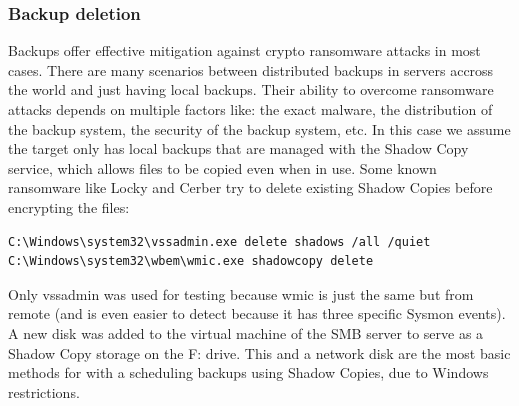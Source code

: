 {%

\subsubsection{Backup deletion}
Backups offer effective mitigation against crypto ransomware attacks in most cases.
There are many scenarios between distributed backups in servers accross the world and just having local backups.
Their ability to overcome ransomware attacks depends on multiple factors like: the exact malware, the distribution of the backup system, the security of the backup system, etc.
\linej
In this case we assume the target only has local backups that are managed with the Shadow Copy service, which allows files to be copied even when in use.
Some known ransomware like Locky and Cerber try to delete existing Shadow Copies before encrypting the files\cite{ransomware_oReilly}:
\begin{lstlisting}[style=PS]
C:\Windows\system32\vssadmin.exe delete shadows /all /quiet
C:\Windows\system32\wbem\wmic.exe shadowcopy delete
\end{lstlisting}
\linej
Only vssadmin was used for testing because wmic is just the same but from remote (and is even easier to detect because it has three specific Sysmon events).
A new disk was added to the virtual machine of the SMB server to serve as a Shadow Copy storage on the F: drive.
This and a network disk are the most basic methods for with a scheduling backups using Shadow Copies, due to Windows restrictions.
\linej
\linej





}
